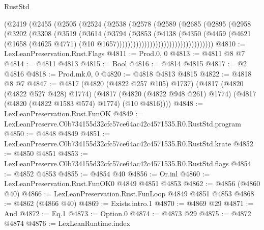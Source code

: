 \begin{lexlean}{RustStd}
\begin{coremodule}
                              (@2419
                                (@2455
                                  (@2505
                                    (@2524
                                      (@2538
                                        (@2578
                                          (@2589
                                            (@2685
                                              (@2895
                                                (@2958
                                                  (@3202
                                                    (@3308
                                                      (@3519
                                                        (@3614
                                                          (@3794
                                                            (@3853
                                                              (@4138
                                                                (@4350
                                                                  (@4459
                                                                    (@4621
                                                                      (@1658
                                                                        (@4625 @4771)
                                                                        (@10
                                                                          @1657)))))))))))))))))))))))))))))))))))
@4810 := LexLeanPreservation.Rust.Flags
@4811 := Prod.{0, 0}
@4813 := @4811 @8 @7
@4814 := @4811 @4813
@4815 := Bool
@4816 := @4814 @4815
@4817 := @2 @4816
@4818 := Prod.mk.{0, 0}
@4820 := @4818 @4813 @4815
@4822 := @4818 @8 @7
@4847 := @4817
    (@4820 (@4822 @257 @105) @1737)
    (@4817
      (@4820 (@4822 @527 @428) @1774)
      (@4817 (@4820 (@4822 @948 @261) @1774) (@4817 (@4820 (@4822 @1583 @574) @1774) (@10 @4816))))
@4848 := LexLeanPreservation.Rust.FunOK
@4849 := LexLeanPreserve.C0b734155d32cfc57ce64ac42c4571535.R0.RustStd.program
@4850 := @4848 @4849
@4851 := LexLeanPreserve.C0b734155d32cfc57ce64ac42c4571535.R0.RustStd.krate
@4852 := @4850 @4851
@4853 := LexLeanPreserve.C0b734155d32cfc57ce64ac42c4571535.R0.RustStd.flags
@4854 := @4852 @4853
@4855 := @4854 @40
@4856 := Or.inl
@4860 := LexLeanPreservation.Rust.FunOK0 @4849 @4851 @4853
@4862 := @4856 (@4860 @40)
@4866 := LexLeanPreservation.Rust.FunLoop @4849 @4851 @4853
@4868 := @4862 (@4866 @40)
@4869 := Exists.intro.{1}
@4870 := @4869 @29
@4871 := And
@4872 := Eq.{1}
@4873 := Option.{0}
@4874 := @4873 @29
@4875 := @4872 @4874
@4876 := LexLeanRuntime.index

\end{coremodule}
\end{lexlean}
